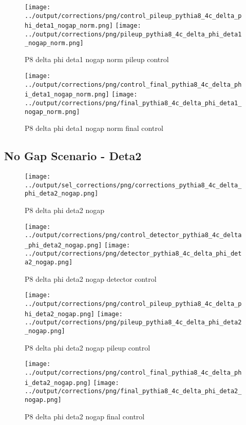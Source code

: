 \documentclass[11pt]{book}
\begin{document}
\begin{figure}[ht]
\centering
\texttt{[image: ../output/corrections/png/control\_pileup\_pythia8\_4c\_delta\_phi\_deta1\_nogap\_norm.png]}
\texttt{[image: ../output/corrections/png/pileup\_pythia8\_4c\_delta\_phi\_deta1\_nogap\_norm.png]}
\caption{P8 delta phi deta1 nogap norm pileup control}
\label{fig:p8_delta_phi_deta1_nogap_norm_pileup_control}
\end{figure}


\begin{figure}[ht]
\centering
\texttt{[image: ../output/corrections/png/control\_final\_pythia8\_4c\_delta\_phi\_deta1\_nogap\_norm.png]}
\texttt{[image: ../output/corrections/png/final\_pythia8\_4c\_delta\_phi\_deta1\_nogap\_norm.png]}
\caption{P8 delta phi deta1 nogap norm final control}
\label{fig:p8_delta_phi_deta1_nogap_norm_final_control}
\end{figure}

\clearpage
\subsection{No Gap Scenario - Deta2}
\begin{figure}[ht]
\centering
\texttt{[image: ../output/sel\_corrections/png/corrections\_pythia8\_4c\_delta\_phi\_deta2\_nogap.png]}
\caption{P8 delta phi deta2 nogap}
\label{fig:p8_delta_phi_deta2_nogap}
\end{figure}

\begin{figure}[ht]
\centering
\texttt{[image: ../output/corrections/png/control\_detector\_pythia8\_4c\_delta\_phi\_deta2\_nogap.png]}
\texttt{[image: ../output/corrections/png/detector\_pythia8\_4c\_delta\_phi\_deta2\_nogap.png]}
\caption{P8 delta phi deta2 nogap detector control}
\label{fig:p8_delta_phi_deta2_nogap_detector_control}
\end{figure}

\begin{figure}[ht]
\centering
\texttt{[image: ../output/corrections/png/control\_pileup\_pythia8\_4c\_delta\_phi\_deta2\_nogap.png]}
\texttt{[image: ../output/corrections/png/pileup\_pythia8\_4c\_delta\_phi\_deta2\_nogap.png]}
\caption{P8 delta phi deta2 nogap pileup control}
\label{fig:p8_delta_phi_deta2_nogap_pileup_control}
\end{figure}


\begin{figure}[ht]
\centering
\texttt{[image: ../output/corrections/png/control\_final\_pythia8\_4c\_delta\_phi\_deta2\_nogap.png]}
\texttt{[image: ../output/corrections/png/final\_pythia8\_4c\_delta\_phi\_deta2\_nogap.png]}
\caption{P8 delta phi deta2 nogap final control}
\label{fig:p8_delta_phi_deta2_nogap_final_control}
\end{figure}
\end{document}
